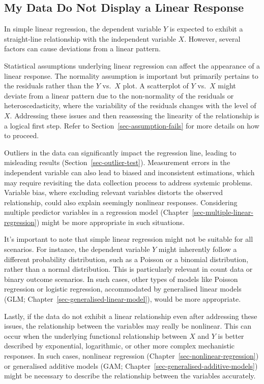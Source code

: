 \documentclass[
  letterpaper,
]{book}
\begin{document}
\subsection{My Data Do Not Display a Linear
Response}\label{my-data-do-not-display-a-linear-response}

In simple linear regression, the dependent variable \(Y\) is expected to
exhibit a straight-line relationship with the independent variable
\(X\). However, several factors can cause deviations from a linear
pattern.

Statistical assumptions underlying linear regression can affect the
appearance of a linear response. The normality assumption is important
but primarily pertains to the residuals rather than the \(Y\) vs.~\(X\)
plot. A scatterplot of \(Y\) vs.~\(X\) might deviate from a linear
pattern due to the non-normality of the residuals or heteroscedasticity,
where the variability of the residuals changes with the level of \(X\).
Addressing these issues and then reassessing the linearity of the
relationship is a logical first step. Refer to
Section~\ref{sec-assumption-fails} for more details on how to proceed.

Outliers in the data can significantly impact the regression line,
leading to misleading results (Section~\ref{sec-outlier-test}).
Measurement errors in the independent variable can also lead to biased
and inconsistent estimations, which may require revisiting the data
collection process to address systemic problems. Variable bias, where
excluding relevant variables distorts the observed relationship, could
also explain seemingly nonlinear responses. Considering multiple
predictor variables in a regression model
(Chapter~\ref{sec-multiple-linear-regression}) might be more appropriate
in such situations.

It's important to note that simple linear regression might not be
suitable for all scenarios. For instance, the dependent variable \(Y\)
might inherently follow a different probability distribution, such as a
Poisson or a binomial distribution, rather than a normal distribution.
This is particularly relevant in count data or binary outcome scenarios.
In such cases, other types of models like Poisson regression or logistic
regression, accommodated by generalised linear models (GLM;
Chapter~\ref{sec-generalised-linear-model}), would be more appropriate.

Lastly, if the data do not exhibit a linear relationship even after
addressing these issues, the relationship between the variables may
really be nonlinear. This can occur when the underlying functional
relationship between \(X\) and \(Y\) is better described by exponential,
logarithmic, or other more complex mechanistic responses. In such cases,
nonlinear regression (Chapter~\ref{sec-nonlinear-regression}) or
generalised additive models (GAM;
Chapter~\ref{sec-generalised-additive-models}) might be necessary to
describe the relationship between the variables accurately.
\end{document}
